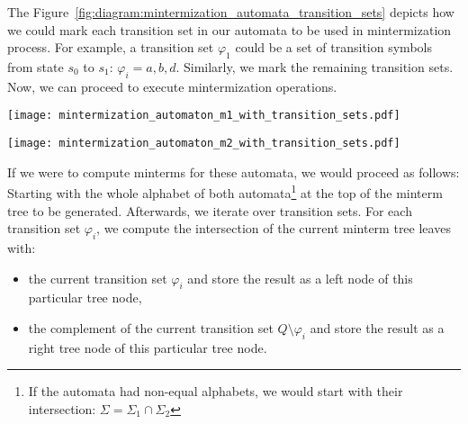 The Figure~\ref{fig:diagram:mintermization_automata_transition_sets} depicts how we could mark each transition set in our automata to be used in mintermization process. For example, a transition set $\varphi_1$ could be a set of transition symbols from state $s_0$ to $s_1$: $\varphi_i = {a, b, d}$. Similarly, we mark the remaining transition sets. Now, we can proceed to execute mintermization operations.

\begin{figure*}[ht]
    \centering
    \begin{minipage}{0.49\linewidth}
        \centering
        \texttt{[image: mintermization\_automaton\_m1\_with\_transition\_sets.pdf]}
        \caption{Finite automaton $A_1$ with transition sets $\varphi_i$.}
        \label{fig:diagram:mintermization_automaton_m1_with_transition_sets}
    \end{minipage}
    \hfill
    \begin{minipage}{0.49\linewidth}
        \centering
        \texttt{[image: mintermization\_automaton\_m2\_with\_transition\_sets.pdf]}
        \caption{Finite automaton $A_2$ with transition sets $\varphi_i$.}
        \label{fig:diagram:mintermization_automaton_m2_with_transition_sets}
    \end{minipage}
    \vspace{0.5cm}
    \caption{Finite automata $A_1$ and $A_2$ with marked transition sets used in mintermization.}
    \label{fig:diagram:mintermization_automata_transition_sets}
\end{figure*}

If we were to compute minterms for these automata, we would proceed as follows: Starting with the whole alphabet of both automata\footnote{If the automata had non-equal alphabets, we would start with their intersection: $\Sigma = \Sigma_1 \cap \Sigma_2$} at the top of the minterm tree to be generated. Afterwards, we iterate over transition sets. For each transition set $\varphi_i$, we compute the intersection of the current minterm tree leaves with:
\begin{itemize}
    \item the current transition set $\varphi_i$ and store the result as a left node of this particular tree node,
    \item the complement of the current transition set $Q \setminus \varphi_i$ and store the result as a right tree node of this particular tree node.
\end{itemize}


